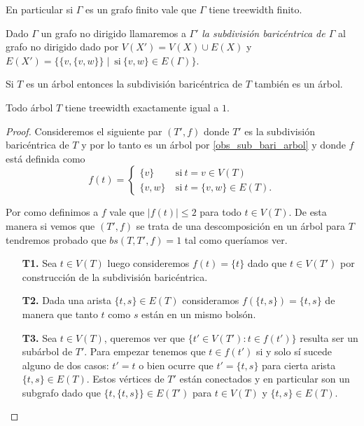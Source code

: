 \documentclass[tesis.tex]{subfiles}
\begin{document}
En particular si $\Gamma$ es un grafo finito vale que $\Gamma$ tiene treewidth finito. 


\begin{deff}
	Dado $\Gamma$ un grafo no dirigido llamaremos a $\Gamma'$ \emph{la subdivisión baricéntrica de $\Gamma$ }al grafo no dirigido dado por
	$V(X') = V(X) \cup E(X)$ y $E(X') = \{ \{ v, \{v,w \} \} \mid \ \text{si} \ \{ v,w \} \in E(\Gamma) \}$.
\end{deff}




\begin{obs}\label{obs_sub_bari_arbol}
	Si $T$ es un árbol entonces la subdivisión baricéntrica de $T$ también es un árbol.
\end{obs}

\begin{prop}\label{desc-arbol-arbol}
	Todo árbol $T$ tiene treewidth exactamente igual a $1$.
\end{prop}

\begin{proof}
	Consideremos el siguiente par $(T',f)$ donde $T'$ es la subdivisión baricéntrica de $T$ y por lo tanto es un árbol por \ref{obs_sub_bari_arbol} y donde $f$ está definida como
	\[
	f(t) = 
	\begin{cases}
		\{ v \} \ & \text{si} \ t = v \in V(T) 				\\
		\{ v,w  \} \ &\text{si} \ t = \{ v,w\} \in E(T).
	\end{cases}
	\]
	
	
	Por como definimos a $f$ vale que $|f(t)| \le 2$ para todo $t \in V(T)$.
	De esta manera si vemos que $(T',f)$ se trata de una descomposición en un árbol para $T$ tendremos probado que $bs(T,T',f) = 1$ tal como queríamos ver.
	
	\begin{enumerate}
		\item[\textbf{T1.}] 
		Sea $t \in V(T)$ luego consideremos $f(t) = \{ t \}$ dado que $t \in V(T')$ por construcción de la subdivisión baricéntrica.
		
		\item[\textbf{T2.}] 
		Dada una arista $\{t,s\} \in E(T)$ consideramos $f(\{ t,s \}) = \{ t,s \} $ de manera que tanto $t$ como $s$ están en un mismo bolsón.
		
		\item[\textbf{T3.}] 
		Sea $t \in V(T)$, queremos ver que $\{ t' \in V(T') :  t \in f(t') \}$ resulta ser un subárbol de $T'$.		
		Para empezar tenemos que $t \in f(t')$ si y solo sí sucede alguno de dos casos:
		$t' = t$ o bien ocurre que $t' = \{ t,s \}$ para cierta arista $\{t,s\} \in E(T)$.
		Estos vértices de $T'$ están conectados y en particular son un subgrafo dado que $ \{t, \{t,s\}\} \in E(T')$ para $t \in V(T)$ y $\{t,s\} \in E(T)$. 
	\end{enumerate}
	
\end{proof}
	
\end{document}
